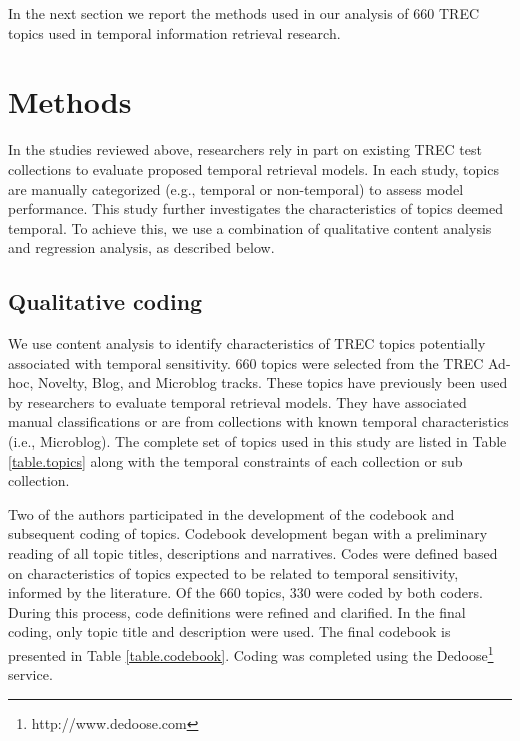 \documentclass[runningheads,a4paper]{llncs}
\begin{document}
In the next section we report the methods used in our analysis of  660 TREC topics used in temporal information retrieval research. 

\section{Methods}

In the studies reviewed above, researchers rely in part on existing TREC test collections to evaluate proposed temporal retrieval models. In each study, topics are manually categorized (e.g.,  temporal or non-temporal) to assess model performance. This study further investigates the characteristics of topics deemed temporal. To achieve this, we use a combination of qualitative content analysis and regression analysis, as described below.

\subsection{Qualitative coding}
We use content analysis \cite{Krippendorff1980} to identify characteristics of TREC topics potentially associated with temporal sensitivity. 660 topics were selected from the TREC Ad-hoc, Novelty, Blog, and Microblog tracks. These topics have previously been used by researchers to evaluate temporal retrieval models. They have associated manual classifications or are from collections with known temporal characteristics (i.e., Microblog). The complete set of topics used in this study are listed in Table \ref{table.topics} along with the temporal constraints of each collection or sub collection.



Two of the authors participated in the development of the codebook and subsequent coding of topics. Codebook development began with a preliminary reading of all topic titles, descriptions and narratives. Codes were defined based on characteristics of topics expected to be related to temporal sensitivity, informed by the literature. Of the 660 topics, 330 were coded by both coders. During this process, code definitions were refined and clarified. In the final coding, only topic title and description were used. The final codebook is presented in Table \ref{table.codebook}. Coding was completed using the Dedoose\footnote{http://www.dedoose.com} service.  
\end{document}
